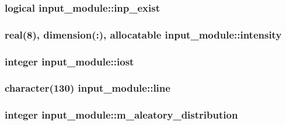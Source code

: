 \subsubsection[{inp\+\_\+exist}]{\setlength{\rightskip}{0pt plus 5cm}logical input\+\_\+module\+::inp\+\_\+exist}\label{namespaceinput__module_af09923ed6808263d4497c13126abdb46}
\hypertarget{namespaceinput__module_ab8a5b4989aa8a656c28df7fa39f21d03}{}
\subsubsection[{intensity}]{\setlength{\rightskip}{0pt plus 5cm}real(8), dimension(\+:), allocatable input\+\_\+module\+::intensity}\label{namespaceinput__module_ab8a5b4989aa8a656c28df7fa39f21d03}
\hypertarget{namespaceinput__module_a865cd5e2924fbc40aeefe8bcb6226a75}{}
\subsubsection[{iost}]{\setlength{\rightskip}{0pt plus 5cm}integer input\+\_\+module\+::iost}\label{namespaceinput__module_a865cd5e2924fbc40aeefe8bcb6226a75}
\hypertarget{namespaceinput__module_a304ebe11a9b47adcaeb6db5be6bae12d}{}
\subsubsection[{line}]{\setlength{\rightskip}{0pt plus 5cm}character(130) input\+\_\+module\+::line}\label{namespaceinput__module_a304ebe11a9b47adcaeb6db5be6bae12d}
\hypertarget{namespaceinput__module_a39c97f997959a940d039403c89a2b62c}{}
\subsubsection[{m\+\_\+aleatory\+\_\+distribution}]{\setlength{\rightskip}{0pt plus 5cm}integer input\+\_\+module\+::m\+\_\+aleatory\+\_\+distribution}\label{namespaceinput__module_a39c97f997959a940d039403c89a2b62c}
\hypertarget{namespaceinput__module_acf6263946873708989398bfd2f91bbef}{}
